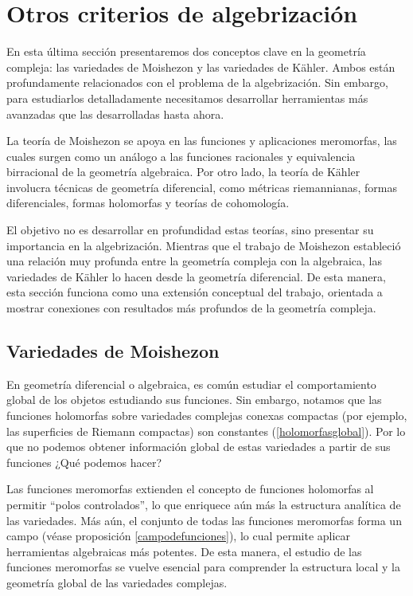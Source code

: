 \section{Otros criterios de algebrización}

En esta última sección presentaremos dos conceptos clave en la geometría compleja: las variedades de Moishezon y las variedades de Kähler. Ambos están profundamente relacionados con el problema de la algebrización. Sin embargo, para estudiarlos detalladamente necesitamos desarrollar herramientas más avanzadas que las desarrolladas hasta ahora.

La teoría de Moishezon se apoya en las funciones y aplicaciones meromorfas, las cuales surgen como un análogo a las funciones racionales y equivalencia birracional de la geometría algebraica. Por otro lado, la teoría de Kähler involucra técnicas de geometría diferencial, como métricas riemannianas, formas diferenciales, formas holomorfas y teorías de cohomología.

El objetivo no es desarrollar en profundidad estas teorías, sino presentar su importancia en la algebrización. Mientras que el trabajo de Moishezon estableció una relación muy profunda entre la geometría compleja con la algebraica, las variedades de Kähler lo hacen desde la geometría diferencial. De esta manera, esta sección funciona como una extensión conceptual del trabajo, orientada a mostrar conexiones con resultados más profundos de la geometría compleja.

\subsection{Variedades de Moishezon}

En geometría diferencial o algebraica, es común estudiar el comportamiento global de los objetos estudiando sus funciones. Sin embargo, notamos que las funciones holomorfas sobre variedades complejas conexas compactas (por ejemplo, las superficies de Riemann compactas) son constantes (\ref{holomorfasglobal}). Por lo que no podemos obtener información global de estas variedades a partir de sus funciones ¿Qué podemos hacer?

Las funciones meromorfas extienden el concepto de funciones holomorfas al permitir \enquote{polos controlados}, lo que enriquece aún más la estructura analítica de las variedades. Más aún, el conjunto de todas las funciones meromorfas forma un campo (véase proposición \ref{campodefunciones}), lo cual permite aplicar herramientas algebraicas más potentes. De esta manera, el estudio de las funciones meromorfas se vuelve esencial para comprender la estructura local y la geometría global de las variedades complejas.


